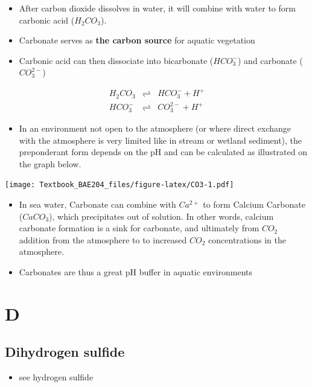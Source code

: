 \documentclass[]{book}
\providecommand{\tightlist}{%
  \setlength{\itemsep}{0pt}\setlength{\parskip}{0pt}}
\theoremstyle{definition}
\theoremstyle{definition}
\theoremstyle{definition}
\theoremstyle{remark}
\begin{document}
\begin{itemize}
\tightlist
\item
  After carbon dioxide dissolves in water, it will combine with water to
  form carbonic acid (\(H_2CO_3\)).
\item
  Carbonate serves as \textbf{the carbon source} for aquatic vegetation
\item
  Carbonic acid can then dissociate into bicarbonate (\(HCO_3^-\)) and
  carbonate (\(CO_3^{2-}\))
\end{itemize}

\begin{align}
H_2CO_3  & \rightleftharpoons & HCO_3^- + H^+  \label{eq:H2CO3} \\
HCO_3^- & \rightleftharpoons & CO_3^{2-} + H^+ \label{eq:HCO3}
\end{align}

\begin{itemize}
\tightlist
\item
  In an environment not open to the atmosphere (or where direct exchange
  with the atmosphere is very limited like in stream or wetland
  sediment), the preponderant form depends on the pH and can be
  calculated as illustrated on the graph below.
\end{itemize}

\texttt{[image: Textbook\_BAE204\_files/figure-latex/CO3-1.pdf]}

\begin{itemize}
\tightlist
\item
  In sea water, Carbonate can combine with \(Ca^{2+}\) to form Calcium
  Carbonate (\(CaCO_3\)), which precipitates out of solution. In other
  words, calcium carbonate formation is a sink for carbonate, and
  ultimately from \(CO_2\) addition from the atmosphere to to increased
  \(CO_2\) concentrations in the atmosphere.
\item
  Carbonates are thus a great pH buffer in aquatic environments
\end{itemize}

\section{D}\label{d}

\subsection{Dihydrogen sulfide}\label{dihydrogen-sulfide}

\begin{itemize}
\tightlist
\item
  see hydrogen sulfide
\end{itemize}
\end{document}
